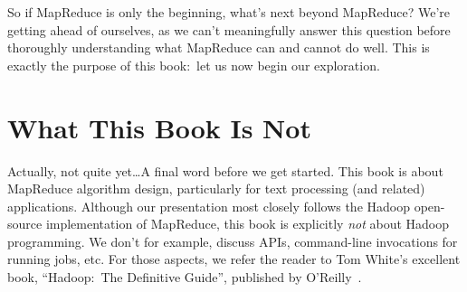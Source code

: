 So if MapReduce is only the beginning, what's next beyond MapReduce?
We're getting ahead of ourselves, as we can't meaningfully answer this
question before thoroughly understanding what MapReduce can and cannot
do well.  This is exactly the purpose of this book:\ let us now begin
our exploration.

\section{What This Book Is Not}

Actually, not quite yet\ldots A final word before we get started.
This book is about MapReduce algorithm design, particularly for text
processing (and related) applications.  Although our presentation most
closely follows the Hadoop open-source implementation of MapReduce,
this book is explicitly \emph{not} about Hadoop programming.  We don't
for example, discuss APIs, command-line invocations for running jobs,
etc.  For those aspects, we refer the reader to Tom White's excellent
book, ``Hadoop:\ The Definitive Guide'', published by
O'Reilly~\cite{White_2009}.
